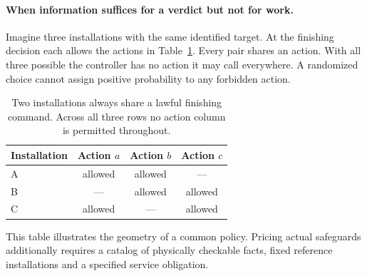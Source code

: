 \paragraph{When information suffices for a verdict but not for work.}
Imagine three installations with the same identified target. At the finishing decision each allows the actions in Table~\ref{tab:block}. Every pair shares an action. With all three possible the controller has no action it may call everywhere. A randomized choice cannot assign positive probability to any forbidden action.
\par\begin{table}[htbp]\centering\small
\caption{Two installations always share a lawful finishing command. Across all three rows no action column is permitted throughout.}\label{tab:block}
\begin{tabular}{lccc}\toprule
Installation & Action \(a\) & Action \(b\) & Action \(c\)\\\midrule
A & allowed & allowed & ---\\
B & --- & allowed & allowed\\
C & allowed & --- & allowed\\\bottomrule
\end{tabular}
\end{table}\par
This table illustrates the geometry of a common policy. Pricing actual safeguards additionally requires a catalog of physically checkable facts, fixed reference installations and a specified service obligation.

